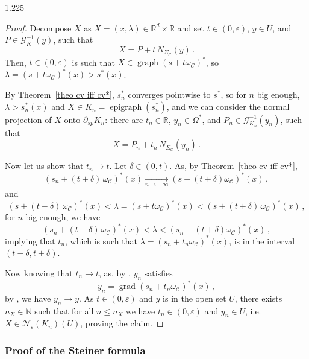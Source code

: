 \documentclass[reqno, a4paper]{amsart}
\numberwithin{equation}{section}
\numberwithin{figure}{section}
\theoremstyle{definition}
\theoremstyle{remark}
\newcommand{\R}{\mathbb{R}} %
\newcommand{\N}{\mathbb{N}} %
\DeclareMathOperator{\grad}{grad} %
\DeclareMathOperator{\graph}{graph} %
\DeclareMathOperator{\epi}{epigraph} %
\newcommand{\C}{\mathcal{C}} %
\renewcommand{\S}{\Sigma_\C} %
\newcommand{\G}{\mathcal{G}} %
\begin{document}
\begin{spacing}{1.225}
\begin{proof}
Decompose $X$ as $X = (x,\lambda)\in \R^d\times \R$ and set $t \in (0,\varepsilon)$, $y \in U$, and $P\in \G^{-1}_K(y)$, such that 
\begin{equation*}
 X = P + t \, N_{\S}(y) \, . 
\end{equation*}
Then, $t \in (0,\varepsilon)$ is such that $X \in \graph (s+t\omega_\C)^*$, so $\lambda = (s+t\omega_\C)^*(x) > s^*(x)$. 

By Theorem~\ref{theo cv iff cv*}, $s_n^*$ converges pointwise to $s^*$, so for $n$ big enough, $\lambda > s_n^*(x)$ and $X \in K_n = \epi(s_n^*)$, and we can consider the normal projection \cite[section 6]{Ablondi_25} of $X$ onto $\partial_{sp}K_n$: there are $t_n \in \R$, $y_n \in \Omega^*$, and $P_n\in \G^{-1}_{K_n}(y_n)$, such that
\begin{equation*}
 X = P_n + t_n \, N_{\S}(y_n) \, . 
\end{equation*}

Now let us show that $t_n \to t$. Let $\delta \in (0,t)$. As, by Theorem~\ref{theo cv iff cv*},
\begin{equation*}
(s_n +(t\pm \delta) \, \omega_\C)^*(x) \xrightarrow[n \to +\infty]{} (s +(t\pm \delta) \omega_\C)^*(x) \, , 
\end{equation*}
and 
\begin{equation*}
(s +(t- \delta) \,\omega_\C)^*(x)< \lambda =(s +t\omega_\C)^*(x) <(s +(t + \delta) \,\omega_\C)^*(x) \, ,
\end{equation*}
for $n$ big enough, we have 
\begin{equation*}
(s_n +(t- \delta) \, \omega_\C)^*(x)< \lambda <(s_n +(t + \delta) \omega_\C)^*(x) \, ,
\end{equation*}
implying that $t_n$, which is such that $\lambda = (s_n +t_n\omega_\C)^*(x)$, is in the interval $(t-\delta,t+\delta)$. 

Now knowing that $t_n \to t$, as, by \cite[Proposition~6.7]{Ablondi_25}, $y_n$ satisfies 
\begin{equation*}
 y_n = \grad(s_n +t_n \omega_\C)^*(x) \, ,
\end{equation*}
by \cite[Theorem~24.5]{Rockafellar_97}, we have $y_n \to y$. As $t \in (0,\varepsilon)$ and $y$ is in the open set $U$, there exists $n_X \in \N$ such that for all $n\leq n_X$ we have $t_n\in (0,\varepsilon)$ and $y_n\in U$, i.e. $X \in \mathcal{N}_\varepsilon(K_n)(U)$, proving the claim. 
\end{proof}


\subsubsection{Proof of the Steiner formula}


\end{spacing}
\end{document}
